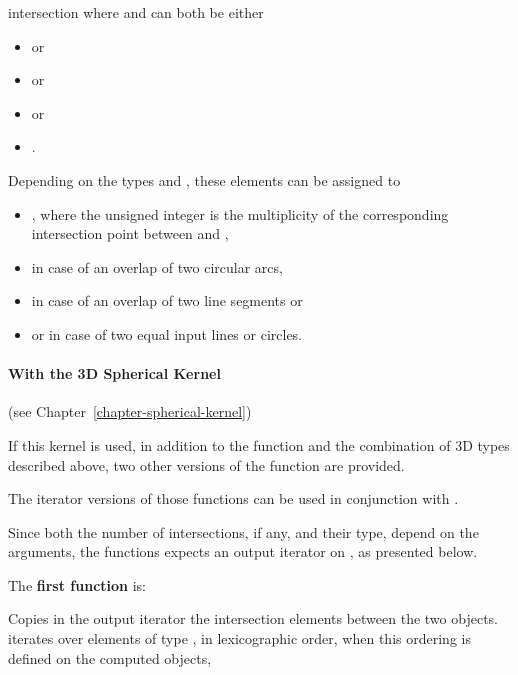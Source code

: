 \begin{ccRefFunction}{intersection}
where  and  can both be either
\begin{itemize}
\item {}  or
\item {}  or
\item {}  or
\item {} .
\end{itemize} 

Depending on the types  and , these
elements can be assigned to
\begin{itemize}
\item {} ,
where the unsigned integer is the multiplicity of the corresponding
intersection point between  and ,
\item {}  in case of an overlap of 
two circular arcs,
\item {}  in case of an overlap of two 
line segments or
\item {}  or 
 in case of two equal input lines or circles.
\end{itemize} 


\paragraph{With the 3D Spherical Kernel} (see Chapter~\ref{chapter-spherical-kernel}) 


If this kernel is used, in addition to the function and the
combination of 3D types described above, two other versions of the function
are provided.

The iterator versions of those functions can be used in conjunction
with .

Since both the number of intersections, if any, and their type,
depend on the arguments, the functions expects an output
iterator on , as presented below.

The \textbf{first function} is:

{Copies in the output iterator the intersection elements between the
two objects.  iterates over
elements of type , in lexicographic order,
when this ordering is defined on the computed objects,}


\end{ccRefFunction}
